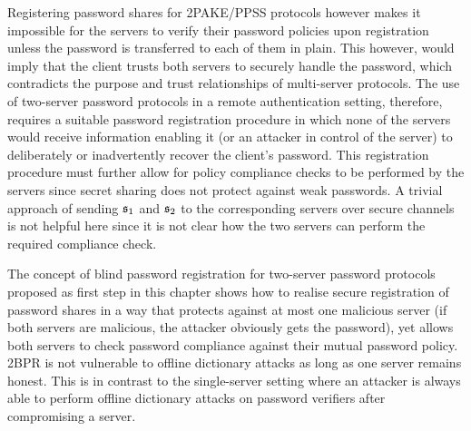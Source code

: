 Registering password shares for \ac{2PAKE}/\ac{PPSS} protocols however makes it impossible for the servers to verify their password policies upon registration unless the password is transferred to each of them in plain. 
This however, would imply that the client trusts both servers to securely handle the password, which contradicts the purpose and trust relationships of multi-server protocols.
The use of two-server password protocols in a remote authentication setting, therefore, requires a suitable password registration procedure in which none of the servers would receive information enabling it (or an attacker in control of the server) to deliberately or inadvertently recover the client's password.
This registration procedure must further allow for policy compliance checks to be performed by the servers since secret sharing does not protect against weak passwords.
A trivial approach of sending $\mathfrak{s}_1$ and $\mathfrak{s}_2$ to the corresponding servers over secure channels is not helpful here since it is not clear how the two servers can perform the required compliance check.

The concept of blind password registration for two-server password protocols proposed as first step in this chapter shows how to realise secure registration of password shares in a way that protects against at most one malicious server (if both servers are malicious, the attacker obviously gets the password), yet allows both servers to check password compliance against their mutual password policy.
\ac{2BPR} is not vulnerable to offline dictionary attacks as long as one server remains honest.
This is in contrast to the single-server setting where an attacker is always able to perform offline dictionary attacks on password verifiers after compromising a server. %

